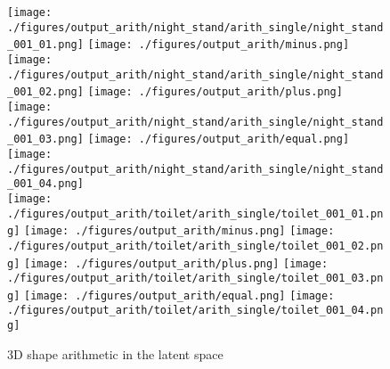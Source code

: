 \documentclass[10pt,twocolumn,letterpaper]{article}
\begin{document}
\begin{figure}
	\centering
	\texttt{[image: ./figures/output\_arith/night\_stand/arith\_single/night\_stand\_001\_01.png]} 
	\texttt{[image: ./figures/output\_arith/minus.png]} 
	\texttt{[image: ./figures/output\_arith/night\_stand/arith\_single/night\_stand\_001\_02.png]} \hspace{-2mm}
	\texttt{[image: ./figures/output\_arith/plus.png]} 
	\texttt{[image: ./figures/output\_arith/night\_stand/arith\_single/night\_stand\_001\_03.png]} 
	\texttt{[image: ./figures/output\_arith/equal.png]} 
	\texttt{[image: ./figures/output\_arith/night\_stand/arith\_single/night\_stand\_001\_04.png]} \hspace{-3mm}	\\
	\texttt{[image: ./figures/output\_arith/toilet/arith\_single/toilet\_001\_01.png]} \hspace{-3mm}
	\texttt{[image: ./figures/output\_arith/minus.png]} 
	\texttt{[image: ./figures/output\_arith/toilet/arith\_single/toilet\_001\_02.png]} \hspace{-2mm}
	\texttt{[image: ./figures/output\_arith/plus.png]} 
	\texttt{[image: ./figures/output\_arith/toilet/arith\_single/toilet\_001\_03.png]} 
	\texttt{[image: ./figures/output\_arith/equal.png]} 
	\texttt{[image: ./figures/output\_arith/toilet/arith\_single/toilet\_001\_04.png]}  \hspace{-3mm}
	\caption{3D shape arithmetic in the latent space}
	\label{fig:arith}
\end{figure}	
\end{document}
